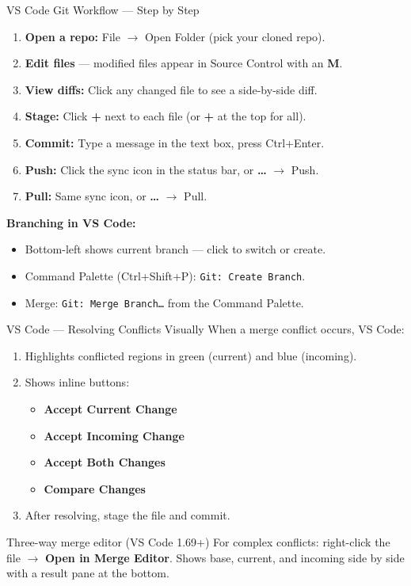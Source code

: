 \documentclass[aspectratio=169, 11pt]{beamer}
\begin{document}
\begin{frame}{VS Code Git Workflow --- Step by Step}
  \begin{enumerate}
    \item \textbf{Open a repo:} File $\to$ Open Folder (pick your cloned repo).
    \item \textbf{Edit files} --- modified files appear in Source Control with an \textbf{M}.
    \item \textbf{View diffs:} Click any changed file to see a side-by-side diff.
    \item \textbf{Stage:} Click \textbf{+} next to each file (or \textbf{+} at the top for all).
    \item \textbf{Commit:} Type a message in the text box, press Ctrl+Enter.
    \item \textbf{Push:} Click the sync icon in the status bar, or \textbf{\ldots} $\to$ Push.
    \item \textbf{Pull:} Same sync icon, or \textbf{\ldots} $\to$ Pull.
  \end{enumerate}

  \vspace{0.5em}
  \textbf{Branching in VS Code:}
  \begin{itemize}
    \item Bottom-left shows current branch --- click to switch or create.
    \item Command Palette (Ctrl+Shift+P): \texttt{Git: Create Branch}.
    \item Merge: \texttt{Git: Merge Branch\ldots} from the Command Palette.
  \end{itemize}
\end{frame}

\begin{frame}{VS Code --- Resolving Conflicts Visually}
  When a merge conflict occurs, VS Code:
  \begin{enumerate}
    \item Highlights conflicted regions in \textcolor{green!60!black}{green} (current) and \textcolor{blue!70!black}{blue} (incoming).
    \item Shows inline buttons:
    \begin{itemize}
      \item \textbf{Accept Current Change}
      \item \textbf{Accept Incoming Change}
      \item \textbf{Accept Both Changes}
      \item \textbf{Compare Changes}
    \end{itemize}
    \item After resolving, stage the file and commit.
  \end{enumerate}

  \vspace{0.5em}
  \begin{block}{Three-way merge editor (VS Code 1.69+)}
    For complex conflicts: right-click the file $\to$ \textbf{Open in Merge Editor}. Shows base, current, and incoming side by side with a result pane at the bottom.
  \end{block}
\end{frame}
\end{document}
